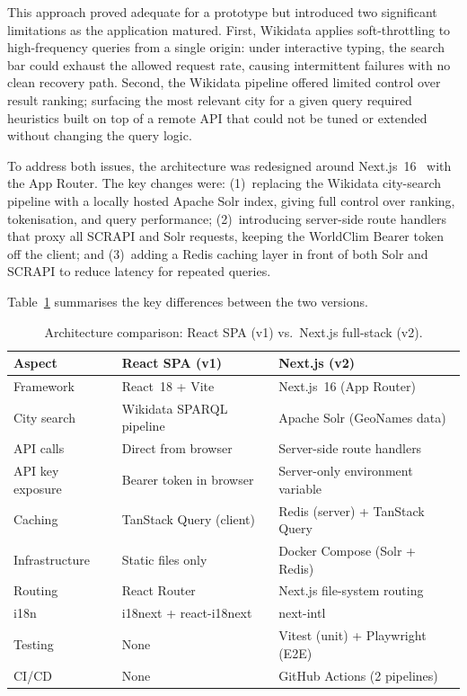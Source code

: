 This approach proved adequate for a prototype but introduced two significant
limitations as the application matured. First, Wikidata applies soft-throttling
to high-frequency queries from a single origin: under interactive typing, the
search bar could exhaust the allowed request rate, causing intermittent failures
with no clean recovery path. Second, the Wikidata pipeline offered limited
control over result ranking; surfacing the most relevant city for a given query
required heuristics built on top of a remote API that could not be tuned or
extended without changing the query logic.

To address both issues, the architecture was redesigned around Next.js~16~\cite{nextjs}
with the App Router. The key changes were: (1)~replacing the Wikidata city-search
pipeline with a locally hosted Apache Solr index, giving full control over
ranking, tokenisation, and query performance; (2)~introducing server-side route
handlers that proxy all SCRAPI and Solr requests, keeping the WorldClim Bearer
token off the client; and (3)~adding a Redis caching layer in front of both
Solr and SCRAPI to reduce latency for repeated queries.

Table~\ref{tab:arch_comparison} summarises the key differences between the two
versions.

\begin{table}[H]
  \centering
  \caption{Architecture comparison: React SPA (v1) vs.\ Next.js full-stack (v2).}
  \label{tab:arch_comparison}
  \small
  \begin{tabular}{p{3.2cm}p{4.8cm}p{4.8cm}}
    \toprule
    \textbf{Aspect} & \textbf{React SPA (v1)} & \textbf{Next.js (v2)} \\
    \midrule
    Framework       & React~18 + Vite        & Next.js~16 (App Router) \\
    City search     & Wikidata SPARQL pipeline & Apache Solr (GeoNames data) \\
    API calls       & Direct from browser    & Server-side route handlers \\
    API key exposure & Bearer token in browser & Server-only environment variable \\
    Caching         & TanStack Query (client) & Redis (server) + TanStack Query \\
    Infrastructure  & Static files only      & Docker Compose (Solr + Redis) \\
    Routing         & React Router           & Next.js file-system routing \\
    i18n            & i18next + react-i18next & next-intl \\
    Testing         & None                   & Vitest (unit) + Playwright (E2E) \\
    CI/CD           & None                   & GitHub Actions (2 pipelines) \\
    \bottomrule
  \end{tabular}
  \normalsize
\end{table}

